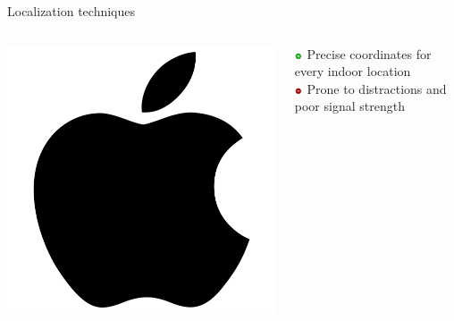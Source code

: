 \documentclass[11pt]{beamer}
\begin{document}
\begin{frame}{Localization techniques}

  \begin{columns}

    \begin{column}{0.17\textwidth}
      \includegraphics[width=\textwidth]{apple}
    \end{column}

    \hfill

    \begin{column}{0.8\textwidth}

      \includegraphics[width=0.05\textwidth]{plus} Precise coordinates for every indoor location\\
      \includegraphics[width=0.05\textwidth]{minus} Prone to distractions and poor signal strength

    \end{column}

  \end{columns}

  \begin{columns}


\end{columns}
\end{frame}
\end{document}

